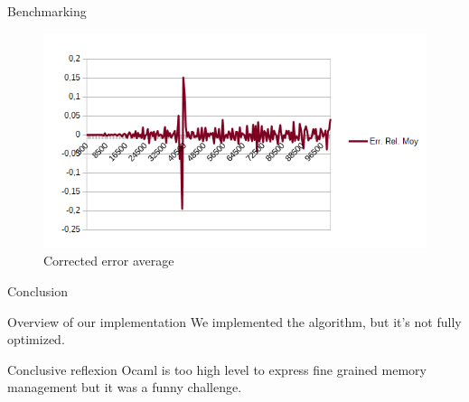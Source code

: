 \documentclass{beamer}
\begin{document}
\begin{frame}{Benchmarking}
\begin{figure}[h!]
   \includegraphics[scale=0.5]{./moy_err.png}
   \caption{\label{figerr} Corrected error average}
\end{figure}
\end{frame}


\begin{frame}{Conclusion}

\begin{block}{Overview of our implementation}
  We implemented the algorithm, but it's not fully optimized. 
\end{block}
  
\begin{block}{Conclusive reflexion}
  Ocaml is too high level to express fine grained memory management
  but it was a funny challenge.
\end{block}

\end{frame}
\end{document}
